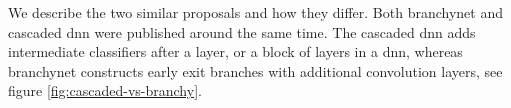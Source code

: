 We describe the two similar proposals and how they differ. Both \gls{branchynet} \cite{teerapittayanon_branchynet:_2016} and cascaded \gls{dnn} \cite{leroux_resource-constrained_2015} were published around the same time. The cascaded \gls{dnn} adds intermediate classifiers after a layer, or a block of layers in a \gls{dnn}, whereas \gls{branchynet} constructs early exit branches with additional convolution layers, see figure \ref{fig:cascaded-vs-branchy}.

\begin{figure}
	\centering

\end{figure}
